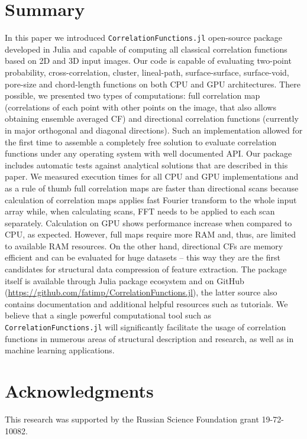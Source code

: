 \documentclass[1p]{elsarticle}
\newcommand{\code}[1]{\colorbox{light-gray}{\texttt{#1}}}
\begin{document}
\section{Summary}
\label{sec:summary}
In this paper we introduced \code{CorrelationFunctions.jl} open-source package
developed in Julia and capable of computing all classical correlation functions
based on 2D and 3D input images. Our code is capable of evaluating two-point
probability, cross-correlation, cluster, lineal-path, surface-surface,
surface-void, pore-size and chord-length functions on both CPU and GPU
architectures. There possible, we presented two types of computations: full
correlation map (correlations of each point with other points on the image, that
also allows obtaining ensemble averaged CF) and directional correlation
functions (currently in major orthogonal and diagonal directions). Such an
implementation allowed for the first time to assemble a completely free solution
to evaluate correlation functions under any operating system with well
documented API. Our package includes automatic tests against analytical
solutions that are described in this paper. We measured execution times for all
CPU and GPU implementations and as a rule of thumb full correlation maps are
faster than directional scans because calculation of correlation maps applies
fast Fourier transform to the whole input array while, when calculating scans,
FFT needs to be applied to each scan separately. Calculation on GPU shows
performance increase when compared to CPU, as expected.  However, full maps
require more RAM and, thus, are limited to available RAM resources. On the other
hand, directional CFs are memory efficient and can be evaluated for huge
datasets -- this way they are the first candidates for structural data
compression of feature extraction. The package itself is available through Julia
package ecosystem and on GitHub
(\url{https://github.com/fatimp/CorrelationFunctions.jl}), the latter source
also contains documentation and additional helpful resources such as tutorials.
We believe that a single powerful computational tool such as
\code{CorrelationFunctions.jl} will significantly facilitate the usage of
correlation functions in numerous areas of structural description and research,
as well as in machine learning applications.

\section{Acknowledgments}
This research was supported by the Russian Science Foundation grant 19-72-10082.
\end{document}
